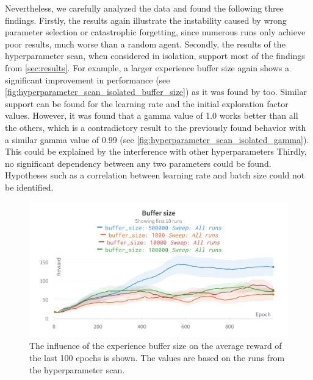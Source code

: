 \documentclass{article}
\begin{document}
Nevertheless, we carefully analyzed the data and found the following three findings.
Firstly, the results again illustrate the instability caused by wrong parameter selection or catastrophic forgetting, 
since numerous runs only achieve poor results, much worse than a random agent. 
Secondly, the results of the hyperparameter scan, when considered in isolation, 
support most of the findings from \autoref{sec:results}. 
For example, a larger experience buffer size again shows a significant improvement in performance (see \autoref{fig:hyperparameter_scan_isolated_buffer_size})
as it was found by \cite{DBLP:conf/icml/FedusRABLRD20} too. 
Similar support can be found for the learning rate and the initial exploration factor values.
However, it was found that a gamma value of 1.0 works better than all the others, 
which is a contradictory result to the previously found behavior with a similar gamma value of 0.99 (see \autoref{fig:hyperparameter_scan_isolated_gamma}).
This could be explained by the interference with other hyperparameters
Thirdly, no significant dependency between any two parameters could be found.
Hypotheses such as a correlation between learning rate and batch size could not be identified. 

\begin{figure}[ht!]
   \centering
   \includegraphics[width=\columnwidth]{assets/hyperparamter-scan/W&B Chart Buffer size.png}
   \caption{The influence of the experience buffer size on the average reward of the last 100 epochs is shown. The values are based on the runs from the hyperparameter scan.
   }
   \label{fig:hyperparameter_scan_isolated_buffer_size}
\end{figure}
\end{document}

